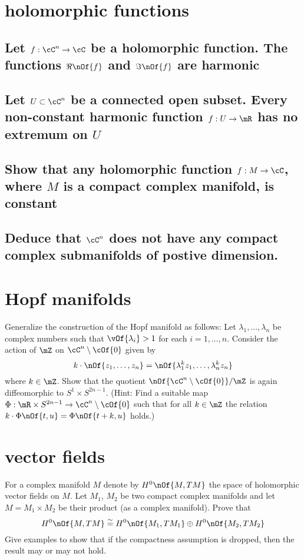 \documentclass[11pt,a4paper]{scrartcl}
\begin{document}
	\section{holomorphic functions}
	\subsection{Let $f : \cC^n \to \cC$ be a holomorphic function.	The functions $\Re\nOf{f}$ and $\Im\nOf{f}$ are harmonic}
	\subsection{Let $U\subset \cC^n$ be a connected open subset. Every non-constant harmonic function $f : U \to \mR$ has no extremum on $U$}
	\subsection{Show that any holomorphic function $f:M \to \cC$, where $M$ is a compact complex manifold, is constant}
	\subsection{Deduce that $\cC^n$ does not have any compact complex submanifolds of postive dimension.}

	\section{Hopf manifolds}
	Generalize the construction of the Hopf manifold as follows: Let $\lambda_1,\dots,\lambda_n$ be complex numbers such that $\vOf{\lambda_i} > 1$ for each $i = 1, \dots, n$. Consider the action of $\mZ$ on $\cC^n\setminus\cOf{0}$ given by
	\begin{equation}
		k\cdot\nOf{z_1,\dots,z_n} = \nOf{\lambda_1^kz_1,\dots,\lambda_n^k z_n}
	\end{equation}
	where $k\in\mZ$. Show that the quotient $\nOf{\cC^n\setminus\cOf{0}}/\mZ$ is again diffeomorphic to $S^1\times S^{2n-1}$. (Hint: Find a suitable map $\Phi: \mR\times S^{2n-1}\to\cC^n\setminus\cOf{0}$ such that for all $k\in\mZ$ the relation $k\cdot\Phi\nOf{t,u} = \Phi\nOf{t+k,u}$ holds.)

	\section{vector fields}
	For a complex manifold $M$ denote by $H^0\nOf{M,TM}$ the space of holomorphic vector fields on $M$. Let $M_1$, $M_2$ be two compact complex manifolds and let $M = M_1\times M_2$ be their product (as a complex manifold). Prove that
	\begin{equation}
		H^0\nOf{M,TM} \stackrel{\sim}{=} H^0\nOf{M_1,TM_1} \oplus H^0\nOf{M_2,TM_2}
	\end{equation}
	Give examples to show that if the compactness assumption is dropped, then the result may or may not hold.
\end{document}
